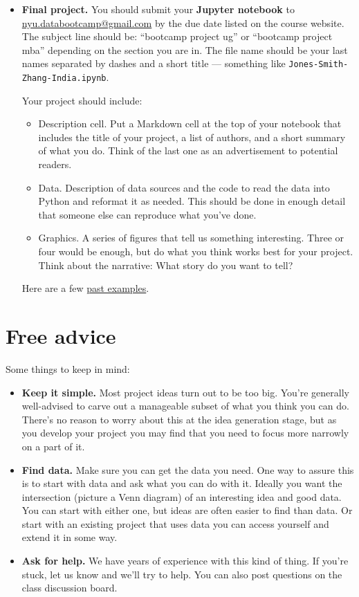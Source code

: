 \documentclass[11pt]{article}
\begin{document}
\begin{itemize}
\item {\bf Final project.}
You should submit your {\bf Jupyter notebook\/} to \href{mailto:nyu.databootcamp@gmail.com}{nyu.databootcamp@gmail.com}
by the due date listed on the course website.
The subject line should be:  ``bootcamp project ug'' or ``bootcamp project mba''
depending on the section you are in.
The file name should be your last names separated by dashes and a short title ---
something like {\tt Jones-Smith-Zhang-India.ipynb}.

Your project should include:
\begin{itemize}
\item Description cell.  Put a Markdown cell at the top of your notebook that
   includes the title of your project, a list of authors, and a short summary
  of what you do.  Think of the last one as an advertisement to potential readers.
\item Data.  Description of data sources and the code to read the data into Python
and reformat it as needed.
This should be done in enough detail that someone else can reproduce what you've done.
\item Graphics.  A series of figures that tell us something interesting.
Three or four would be enough, but do what you think works best for your project.
Think about the narrative:  What story do you want to tell?
\end{itemize}
Here are a few \href{https://github.com/NYUDataBootcamp/Projects}
{past examples}.
\end{itemize}


\section*{Free advice}

Some things to keep in mind:
%
\begin{itemize}
\item {\bf Keep it simple.}
Most project ideas turn out to be too big.  You're generally well-advised
to carve out a manageable subset of what you think you can do.
There's no reason to worry about this at the idea generation stage,
but as you develop your project you may find that you need to focus
more narrowly on a part of it.

\item {\bf Find data.}  Make sure you can get the data you need.
One way to assure this is to start with data and ask what you can do with it.
Ideally you want the intersection (picture a Venn diagram) of an interesting
idea and good data.  You can start with either one, but ideas are often easier to
find than data.
Or start with an existing project that uses data you can access yourself
and extend it in some way.


\item {\bf Ask for help.}
We have years of experience with this kind of thing.
If you're stuck, let us know and we'll try to help.
You can also post questions on the class discussion board.

\end{itemize}
\end{document}
